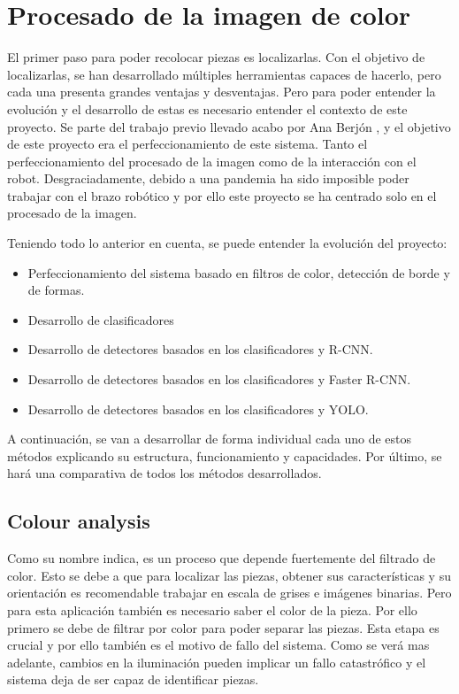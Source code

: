 \chapter{Procesado de la imagen de color}
\label{chap:Procesado de la imagen de color}

El primer paso para poder recolocar piezas es localizarlas. Con el objetivo de localizarlas, se han desarrollado múltiples herramientas capaces de hacerlo, pero cada una presenta grandes ventajas y desventajas. Pero para poder entender la evolución y el desarrollo de estas es necesario entender el contexto de este proyecto. Se parte del trabajo previo llevado acabo por Ana Berjón \cite{TFGAna}, y el objetivo de este proyecto era el perfeccionamiento de este sistema. Tanto el perfeccionamiento del procesado de la imagen como de la interacción con el robot. Desgraciadamente, debido a una pandemia ha sido imposible poder trabajar con el brazo robótico y por ello este proyecto se ha centrado solo en el procesado de la imagen.

Teniendo todo lo anterior en cuenta, se puede entender la evolución del proyecto:
\begin{itemize}
\item Perfeccionamiento del sistema basado en filtros de color, detección de borde y de formas.
\item Desarrollo de clasificadores
\item Desarrollo de detectores basados en los clasificadores y R-CNN.
\item Desarrollo de detectores basados en los clasificadores y Faster R-CNN.
\item Desarrollo de detectores basados en los clasificadores y YOLO.
\end{itemize}
A continuación, se van a desarrollar de forma individual cada uno de estos métodos explicando su estructura, funcionamiento y capacidades. Por último, se hará una comparativa de todos los métodos desarrollados.

\section{Colour analysis}
\label{sec:Colour analysis}
Como su nombre indica, es un proceso que depende fuertemente del filtrado de color. Esto se debe a que para localizar las piezas, obtener sus características y su orientación es recomendable trabajar en escala de grises e imágenes binarias. Pero para esta aplicación también es necesario saber el color de la pieza. Por ello primero se debe de filtrar por color para poder separar las piezas. Esta etapa es crucial y por ello también es el motivo de fallo del sistema. Como se verá mas adelante, cambios en la iluminación pueden implicar un fallo catastrófico y el sistema deja de ser capaz de identificar piezas.

